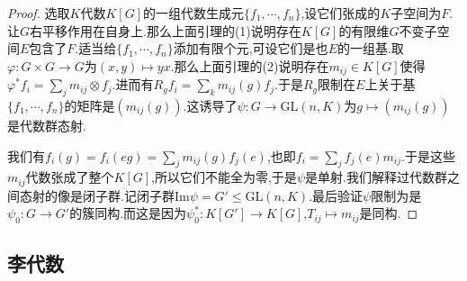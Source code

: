 \begin{enumerate}
\begin{proof}
    	选取$K$代数$K[G]$的一组代数生成元$\{f_1,\cdots,f_n\}$,设它们张成的$K$子空间为$F$.让$G$右平移作用在自身上.那么上面引理的(1)说明存在$K[G]$的有限维$G$不变子空间$E$包含了$F$.适当给$\{f_1,\cdots,f_n\}$添加有限个元,可设它们是也$E$的一组基.取$\varphi:G\times G\to G$为$(x,y)\mapsto yx$.那么上面引理的(2)说明存在$m_{ij}\in K[G]$使得$\varphi^*f_i=\sum_jm_{ij}\otimes f_j$.进而有$R_gf_i=\sum_km_{ij}(g)f_j$.于是$R_g$限制在$E$上关于基$\{f_1,\cdots,f_n\}$的矩阵是$(m_{ij}(g))$.这诱导了$\psi:G\to\mathrm{GL}(n,K)$为$g\mapsto(m_{ij}(g))$是代数群态射.
    	
    	\qquad
    	
    	我们有$f_i(g)=f_i(eg)=\sum_jm_{ij}(g)f_j(e)$,也即$f_i=\sum_jf_j(e)m_{ij}$.于是这些$m_{ij}$代数张成了整个$K[G]$,所以它们不能全为零,于是$\psi$是单射.我们解释过代数群之间态射的像是闭子群.记闭子群$\mathrm{Im}\psi=G'\le\mathrm{GL}(n,K)$.最后验证$\psi$限制为是$\psi_0:G\to G'$的簇同构.而这是因为$\psi_0^*:K[G']\to K[G]$,$T_{ij}\mapsto m_{ij}$是同构.
    \end{proof}
\end{enumerate}
\subsection{李代数}

